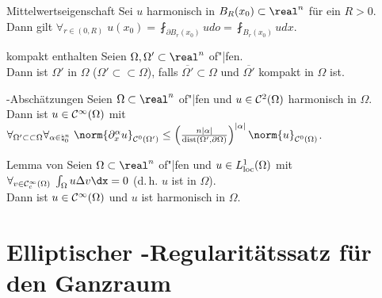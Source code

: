 \begin{Satz}{Mittelwertseigenschaft}
    Sei $u$ harmonisch in $B_R(x_0) \subset \real^n$ für ein $R > 0$.\\
    Dann gilt $\forall_{r \in (0, R)}\; u(x_0) = \fint_{\partial B_r(x_0)} udo =
    \fint_{B_r(x_0)} udx$.
\end{Satz}

\linie

\begin{Def}{kompakt enthalten}
    Seien $\Omega, \Omega' \subset \real^n$ of"|fen.\\
    Dann ist $\Omega'$ in $\Omega$ 
    ($\Omega' \subset\subset \Omega$), falls $\overline{\Omega'} \subset \Omega$ und
    $\overline{\Omega'}$ kompakt in $\Omega$ ist.
\end{Def}


\begin{Satz}{-Abschätzungen}
    Seien $\Omega \subset \real^n$ of"|fen und
    $u \in \mathcal{C}^2(\Omega)$ harmonisch in $\Omega$.\\
    Dann ist $u \in \mathcal{C}^\infty(\Omega)$ mit
    $\forall_{\Omega' \subset\subset \Omega} \forall_{\alpha \in \natural_0^n}\;
    \norm{\partial^\alpha_x u}_{\C^0(\Omega')} \le
    \left(\frac{n|\alpha|}{\dist(\Omega', \partial\Omega)}\right)^{|\alpha|}
    \norm{u}_{\C^0(\Omega)}$.
\end{Satz}

\begin{Lemma}{Lemma von }
    Seien $\Omega \subset \real^n$ of"|fen und $u \in L^1_{\text{loc}}(\Omega)$ mit
    $\forall_{v \in \C^\infty_c(\Omega)}\; \int_\Omega u \Delta v\dx = 0$
    (d.\,h. $u$ ist  in $\Omega$).\\
    Dann ist $u \in \mathcal{C}^\infty(\Omega)$ und $u$ ist harmonisch in $\Omega$.
\end{Lemma}

\pagebreak

\section{%
    Elliptischer -Regularitätssatz für den Ganzraum%
}

